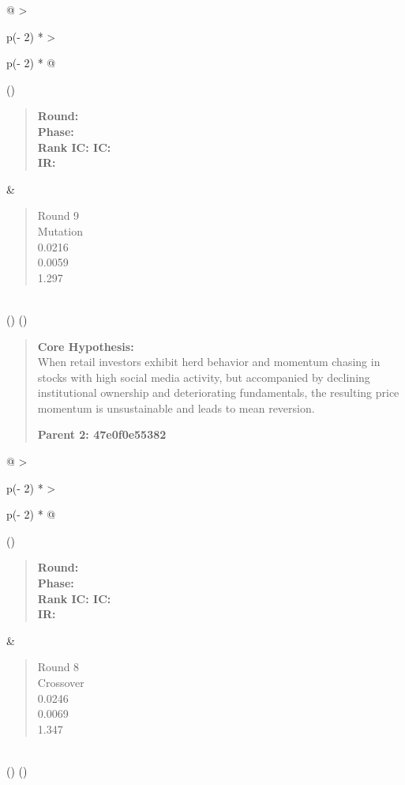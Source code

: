 \documentclass[
]{article}
\begin{document}
\begin{longtable}[]{@{}
  >{\raggedright\arraybackslash}p{(\columnwidth - 2\tabcolsep) * }
  >{\raggedright\arraybackslash}p{(\columnwidth - 2\tabcolsep) * }@{}}
\toprule()
\begin{minipage}[b]{\linewidth}\raggedright
\begin{quote}
\textbf{Round:}\\
\textbf{Phase:}\\
\textbf{Rank IC: IC:}\\
\textbf{IR:}
\end{quote}\strut
\end{minipage} & \begin{minipage}[b]{\linewidth}\raggedright
\begin{quote}
Round 9\\
Mutation\\
0.0216\\
0.0059\\
1.297
\end{quote}\strut
\end{minipage} \\
\midrule()
\endhead
\bottomrule()
\end{longtable}

\begin{quote}
\textbf{Core Hypothesis:}\\
When retail investors exhibit herd behavior and momentum chasing in
stocks with high social media activity, but accompanied by declining
institutional ownership and deteriorating fundamentals, the resulting
price momentum is unsustainable and leads to mean reversion.

\textbf{Parent 2: 47e0f0e55382}
\end{quote}

\begin{longtable}[]{@{}
  >{\raggedright\arraybackslash}p{(\columnwidth - 2\tabcolsep) * }
  >{\raggedright\arraybackslash}p{(\columnwidth - 2\tabcolsep) * }@{}}
\toprule()
\begin{minipage}[b]{\linewidth}\raggedright
\begin{quote}
\textbf{Round:}\\
\textbf{Phase:}\\
\textbf{Rank IC: IC:}\\
\textbf{IR:}
\end{quote}\strut
\end{minipage} & \begin{minipage}[b]{\linewidth}\raggedright
\begin{quote}
Round 8\\
Crossover\\
0.0246\\
0.0069\\
1.347
\end{quote}\strut
\end{minipage} \\
\midrule()
\endhead
\bottomrule()
\end{longtable}
\end{document}
